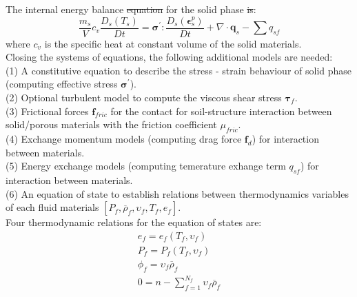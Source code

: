 \documentclass[preprint,12pt]{elsarticle}
\providecommand{\DIFadd}[1]{{\protect\color{blue}\uwave{#1}}} %
\providecommand{\DIFdel}[1]{{\protect\color{red}\sout{#1}}}                      %
\providecommand{\DIFaddbegin}{} %
\providecommand{\DIFaddend}{} %
\providecommand{\DIFdelbegin}{} %
\providecommand{\DIFdelend}{} %
\newcommand{\DIFscaledelfig}{0.5}
\newlength{\DIFdelgraphicswidth} %
\newlength{\DIFdelgraphicsheight} %
\newcommand{\DIFaddincludegraphics}[2][]{{\color{blue}\fbox{\DIFOincludegraphics[#1]{#2}}}} %
\newcommand{\DIFdelincludegraphics}[2][]{%
\sbox{\DIFdelgraphicsbox}{\DIFOincludegraphics[#1]{#2}}%
\settoboxwidth{\DIFdelgraphicswidth}{\DIFdelgraphicsbox} %
\settoboxtotalheight{\DIFdelgraphicsheight}{\DIFdelgraphicsbox} %
\scalebox{\DIFscaledelfig}{%
\parbox[b]{\DIFdelgraphicswidth}{\usebox{\DIFdelgraphicsbox}\\[-\baselineskip] \rule{\DIFdelgraphicswidth}{0em}}\llap{\resizebox{\DIFdelgraphicswidth}{\DIFdelgraphicsheight}{%
\setlength{\unitlength}{\DIFdelgraphicswidth}%
\begin{picture}(1,1)%
\thicklines\linethickness{2pt} %
{\color[rgb]{1,0,0}\put(0,0){\framebox(1,1){}}}%
{\color[rgb]{1,0,0}\put(0,0){\line( 1,1){1}}}%
{\color[rgb]{1,0,0}\put(0,1){\line(1,-1){1}}}%
\end{picture}%
}\hspace*{3pt}}} %
} %
\DeclareRobustCommand{\DIFaddbegin}{\DIFOaddbegin \let\includegraphics\DIFaddincludegraphics} %
\DeclareRobustCommand{\DIFaddend}{\DIFOaddend \let\includegraphics\DIFOincludegraphics} %
\DeclareRobustCommand{\DIFdelbegin}{\DIFOdelbegin \let\includegraphics\DIFdelincludegraphics} %
\DeclareRobustCommand{\DIFdelend}{\DIFOaddend \let\includegraphics\DIFOincludegraphics} %
\begin{document}
%
%
The internal energy balance \DIFdelbegin \DIFdel{equation }\DIFdelend \DIFaddbegin \DIFadd{equations }\DIFaddend for the solid phase \DIFdelbegin \DIFdel{is}\DIFdelend \DIFaddbegin \DIFadd{are}\DIFaddend :
%
%
\begin{equation}
    \label{solidenergy}
     \frac{m_s}{V}  c_v \frac{D_s( T_s)}{Dt} = \pmb{\sigma}^\prime: \frac{D_s( \pmb{\epsilon}_s^p)}{Dt} + \nabla \cdot \pmb{q}_s -  \sum q_{sf} 
\end {equation}
%
%
where $c_v$ is the specific heat at constant volume of the solid materials.
\underline{\hspace{5in}}\\
Closing the systems of equations, the following additional models are needed: \\
(1) A constitutive equation to describe the stress - strain behaviour of solid phase (computing effective stress $\pmb{\sigma}^\prime$). \\
(2) Optional turbulent model to compute the viscous shear stress $\pmb{\tau}_f$.\\
(3) Frictional forces $\pmb{f}_{fric}$ for the contact for soil-structure interaction between solid/porous materials with the friction coefficient $\mu_{fric}$. \\
(4) Exchange momentum models (computing drag force $\pmb{f}_{d}$) for interaction between materials. \\
(5) Energy exchange models (computing temerature exhange term $q_{sf}$) for interaction between materials. \\
(6) An equation of state to establish relations between thermodynamics variables of each fluid materials $[P_{f}, \overline{\rho}_f, \upsilon_f, T_f, e_f]$. \\
Four thermodynamic relations for the equation of states are:
%
%
\begin{equation}
\begin{gathered}
  e_f =  e_f (T_f, \upsilon_f)\\
 P_f =  P_f(T_f, \upsilon_f)\\
  \phi_f = \upsilon_f \overline{\rho}_f\\
  0 = n - \sum_{f=1}^{N_f} \upsilon_f \overline{\rho}_f\\
\end {gathered}
\end {equation}
%
%
\end{document}
